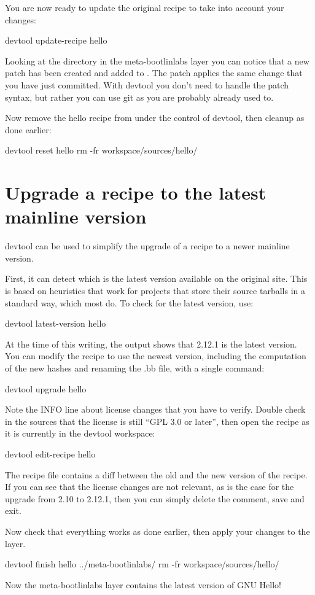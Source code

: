You are now ready to update the original recipe to take into account your
changes:

\begin{bashinput}
devtool update-recipe hello
\end{bashinput}

Looking at the  directory in the meta-bootlinlabs
layer you can notice that a new patch has been created and added to
. The patch applies the same change that you have just
committed. With devtool you don't need to handle the patch syntax, but
rather you can use git as you are probably already used to.

Now remove the hello recipe from under the control of devtool, then cleanup
as done earlier:

\begin{bashinput}
devtool reset hello
rm -fr workspace/sources/hello/
\end{bashinput}

\section{Upgrade a recipe to the latest mainline version}

devtool can be used to simplify the upgrade of a recipe to a newer mainline
version.

First, it can detect which is the latest version available on the original
site. This is based on heuristics that work for projects that store their
source tarballs in a standard way, which most do. To check for the latest
version, use:
\begin{bashinput}
devtool latest-version hello
\end{bashinput}

At the time of this writing, the output shows that 2.12.1 is the latest
version. You can modify the recipe to use the newest version, including the
computation of the new hashes and renaming the .bb file, with a single
command:
\begin{bashinput}
devtool upgrade hello
\end{bashinput}

Note the INFO line about license changes that you have to verify. Double
check in the sources that the license is still ``GPL 3.0 or later'', then
open the recipe as it is currently in the devtool workspace:
\begin{bashinput}
devtool edit-recipe hello
\end{bashinput}

The recipe file contains a diff between the old and the new version of the
recipe. If you can see that the license changes are not relevant, as is the
case for the upgrade from 2.10 to 2.12.1, then you can simply delete the
comment, save and exit.

Now check that everything works as done earlier, then apply your changes to the layer.
\begin{bashinput}
devtool finish hello ../meta-bootlinlabs/
rm -fr workspace/sources/hello/
\end{bashinput}

Now the meta-bootlinlabs layer contains the latest version of GNU Hello!
